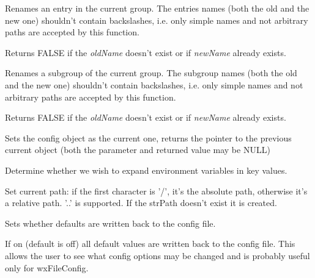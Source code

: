 
Renames an entry in the current group. The entries names (both the old and
the new one) shouldn't contain backslashes, i.e. only simple names and not
arbitrary paths are accepted by this function.

Returns FALSE if the {\it oldName} doesn't exist or if {\it newName} already
exists.

\label{wxconfigbaserenamegroup}


Renames a subgroup of the current group. The subgroup names (both the old and
the new one) shouldn't contain backslashes, i.e. only simple names and not
arbitrary paths are accepted by this function.

Returns FALSE if the {\it oldName} doesn't exist or if {\it newName} already
exists.

\label{wxconfigbaseset}


Sets the config object as the current one, returns the pointer to the previous
current object (both the parameter and returned value may be NULL)

\label{wxconfigbasesetexpandenvvars}


Determine whether we wish to expand environment variables in key values.

\label{wxconfigbasesetpath}


Set current path: if the first character is '/', it's the absolute path,
otherwise it's a relative path. '..' is supported. If the strPath doesn't
exist it is created.

\label{wxconfigbasesetrecorddefaults}


Sets whether defaults are written back to the config file.

If on (default is off) all default values are written back to the config file.
This allows the user to see what config options may be changed and is probably
useful only for wxFileConfig.

